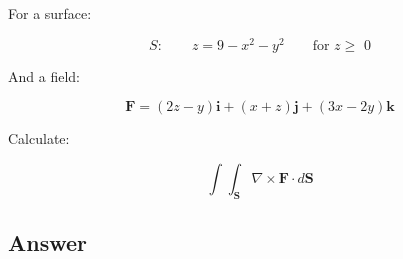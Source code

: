 \documentclass{article}
\begin{document}
For a surface:

\begin{equation}
  S: \qquad z = 9 -x^{2} - y^{2} \qquad \text{for $z \geq$ 0}
\end{equation}

And a field:

\begin{equation}
  \mathbf{F} = \left( 2z - y \right) \mathbf{i}  +
  \left( x + z \right) \mathbf{j} + 
  \left( 3x - 2y \right) \mathbf{k}
\end{equation}

Calculate:

\begin{equation}
  \int^{}_{} \int^{}_{\mathbf{S}} \nabla \times \mathbf{F} \cdot d\mathbf{S}
\end{equation}


\subsection{Answer}
\end{document}
